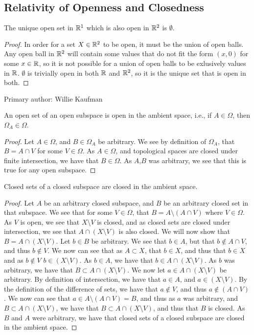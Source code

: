 \subsection{Relativity of Openness and Closedness}
\begin{majorEx}%
The unique open set in $\mathbb{R}^1$ which is also open in $\mathbb{R}^2$ is $\emptyset$.
\end{majorEx}
\begin{proof}
In order for a set $X \in \mathbb{R}^2$ to be open, it must be the union of open balls. Any open ball in $\mathbb{R}^2$ will contain some values that do not fit the form $(x, 0)$ for some $x \in \mathbb{R}$, so it is not possible for a union of open balls to be exlusively values in $\mathbb{R}$. $\emptyset$ is trivially open in both $\mathbb{R}$ and $\mathbb{R}^2$, so it is the unique set that is open in both. 
\end{proof}

Primary author: Willie Kaufman

\begin{majorEx}%
An open set of an open subspace is open in the ambient space, i.e., if $A \in \Omega$, then $\Omega_A \in \Omega$.
\end{majorEx}
\begin{proof}
  Let $A\in \Omega$, and $B \in \Omega_A$ be arbitrary. We see by
  definition of 
  $\Omega_A$, that $B = A \cap V$ for some $V\in \Omega$. As $A\in
  \Omega$, and topological spaces are closed under finite
  intersection, we have that $B \in \Omega$. As $A$,$B$ was arbitrary, we
  see that this is true for any open subspace.
\end{proof}

\begin{majorEx}%
Closed sets of a closed subspace are closed in the ambient space.
\end{majorEx}
\begin{proof}
  Let $A$ be an arbitrary closed subspace, and $B$ be an arbitrary
  closed set in that subspace. We see that for some $V\in \Omega$,
  that $B= A \setminus (A\cap V)$ where $V \in \Omega$. As $V$ is
  open, we see that $X \setminus V$ is closed, and as closed sets are
  closed under intersection, we see that $A \cap (X \setminus V)$ is
  also closed. We will now show that $B =A \cap (X \setminus V)$. Let
  $b\in B$ be arbitrary. We see that $b\in A$, but that $b \notin
  A \cap V$, and thus $b \notin V$. We now can see that as $A\subset
  X$, that $b\in X$, and thus that $b\in X$ and as $b\notin V$ $b\in
  (X\setminus V)$. As $b \in A$, we have that $b\in A \cap (X\setminus
  V)$. As $b$ was arbitrary, we have that $B \subset A \cap (X \setminus V)$.
  We now let  $a\in A \cap (X \setminus V)$ be arbitrary. By
  definition of intersection, we have that $a \in A$, and 
  $a \in  (X \setminus V)$. By the definition of the difference of
  sets, we have that $a \notin V$, and thus  $a \notin (A\cap V)$. We
  now can see that $a \in A \setminus (A\cap V) = B$, and thus as $a$
  was arbitrary, and $B \subset A \cap (X \setminus V)$, we have that
  $B \subset A \cap (X \setminus V)$, and thus that $B$ is closed. As
  $B$ and $A$ were arbitrary, we have that closed sets of a closed
  subspace are closed in the ambient space. 
\end{proof}

